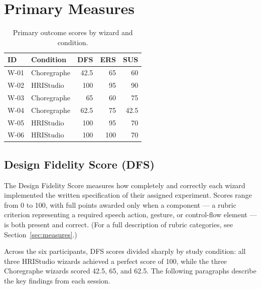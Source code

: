 \section{Primary Measures}

\begin{table}[htbp]
\centering
\footnotesize
\begin{tabular}{|l|l|r|r|r|}
\hline
\textbf{ID} & \textbf{Condition} & \textbf{DFS} & \textbf{ERS} & \textbf{SUS} \\
\hline
W-01 & Choregraphe & 42.5 & 65 & 60 \\
\hline
W-02 & HRIStudio & 100 & 95 & 90 \\
\hline
W-03 & Choregraphe & 65 & 60 & 75 \\
\hline
W-04 & Choregraphe & 62.5 & 75 & 42.5 \\
\hline
W-05 & HRIStudio & 100 & 95 & 70 \\
\hline
W-06 & HRIStudio & 100 & 100 & 70 \\
\hline
\end{tabular}
\caption{Primary outcome scores by wizard and condition.}
\label{tbl:primary-outcomes}
\end{table}

\subsection{Design Fidelity Score (DFS)}

The Design Fidelity Score measures how completely and correctly each wizard implemented the written specification of their assigned experiment. Scores range from 0 to 100, with full points awarded only when a component — a rubric criterion representing a required speech action, gesture, or control-flow element — is both present and correct. (For a full description of rubric categories, see Section~\ref{sec:measures}.)

Across the six participants, DFS scores divided sharply by study condition: all three HRIStudio wizards achieved a perfect score of 100, while the three Choregraphe wizards scored 42.5, 65, and 62.5. The following paragraphs describe the key findings from each session.

